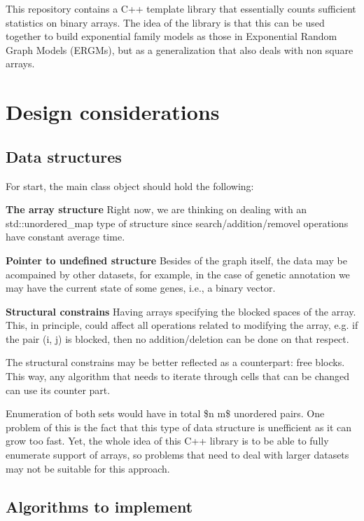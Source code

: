 This repository contains a C++ template library that essentially counts sufficient statistics on binary arrays. The idea of the library is that this can be used together to build exponential family models as those in Exponential Random Graph Models (E\+R\+G\+Ms), but as a generalization that also deals with non square arrays.

\section*{Design considerations}

\subsection*{Data structures}

For start, the main class object should hold the following\+:


\begin{DoxyItemize}
\item {\bfseries The array structure} Right now, we are thinking on dealing with an {\ttfamily std\+::unordered\+\_\+map} type of structure since search/addition/removel operations have constant average time.
\item {\bfseries Pointer to undefined structure} Besides of the graph itself, the data may be acompained by other datasets, for example, in the case of genetic annotation we may have the current state of some genes, i.\+e., a binary vector.
\item {\bfseries Structural constrains} Having arrays specifying the blocked spaces of the array. This, in principle, could affect all operations related to modifying the array, e.\+g. if the pair {\ttfamily (i, j)} is blocked, then no addition/deletion can be done on that respect.

The structural constrains may be better reflected as a counterpart\+: free blocks. This way, any algorithm that needs to iterate through cells that can be changed can use its counter part.

Enumeration of both sets would have in total \$n  m\$ unordered pairs. One problem of this is the fact that this type of data structure is unefficient as it can grow too fast. Yet, the whole idea of this C++ library is to be able to fully enumerate support of arrays, so problems that need to deal with larger datasets may not be suitable for this approach.
\end{DoxyItemize}

\subsection*{Algorithms to implement}


